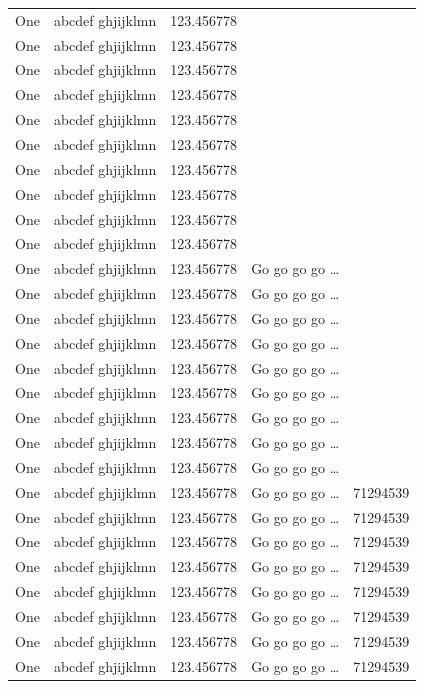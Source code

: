 \documentclass[phd]{ndsu-thesis-2022}
\begin{document}
\begin{longtable}{l l l l r}
One & abcdef ghjijklmn & 123.456778 \\
One & abcdef ghjijklmn & 123.456778 \\
One & abcdef ghjijklmn & 123.456778 \\
One & abcdef ghjijklmn & 123.456778 \\
One & abcdef ghjijklmn & 123.456778 \\
One & abcdef ghjijklmn & 123.456778 \\
One & abcdef ghjijklmn & 123.456778 \\
One & abcdef ghjijklmn & 123.456778 \\
One & abcdef ghjijklmn & 123.456778 \\
One & abcdef ghjijklmn & 123.456778 \\
One & abcdef ghjijklmn & 123.456778  & Go go go go \ldots \\
One & abcdef ghjijklmn & 123.456778  & Go go go go \ldots \\
One & abcdef ghjijklmn & 123.456778  & Go go go go \ldots \\
One & abcdef ghjijklmn & 123.456778  & Go go go go \ldots \\
One & abcdef ghjijklmn & 123.456778  & Go go go go \ldots \\
One & abcdef ghjijklmn & 123.456778  & Go go go go \ldots \\
One & abcdef ghjijklmn & 123.456778  & Go go go go \ldots \\
One & abcdef ghjijklmn & 123.456778  & Go go go go \ldots \\
One & abcdef ghjijklmn & 123.456778  & Go go go go \ldots \\
One & abcdef ghjijklmn & 123.456778  & Go go go go \ldots & \num{71294539}\\
One & abcdef ghjijklmn & 123.456778  & Go go go go \ldots & \num{71294539}\\
One & abcdef ghjijklmn & 123.456778  & Go go go go \ldots & \num{71294539}\\
One & abcdef ghjijklmn & 123.456778  & Go go go go \ldots & \num{71294539}\\
One & abcdef ghjijklmn & 123.456778  & Go go go go \ldots & \num{71294539}\\
One & abcdef ghjijklmn & 123.456778  & Go go go go \ldots & \num{71294539}\\
One & abcdef ghjijklmn & 123.456778  & Go go go go \ldots & \num{71294539}\\
One & abcdef ghjijklmn & 123.456778  & Go go go go \ldots & \num{71294539}\\

\end{longtable}
\end{document}
